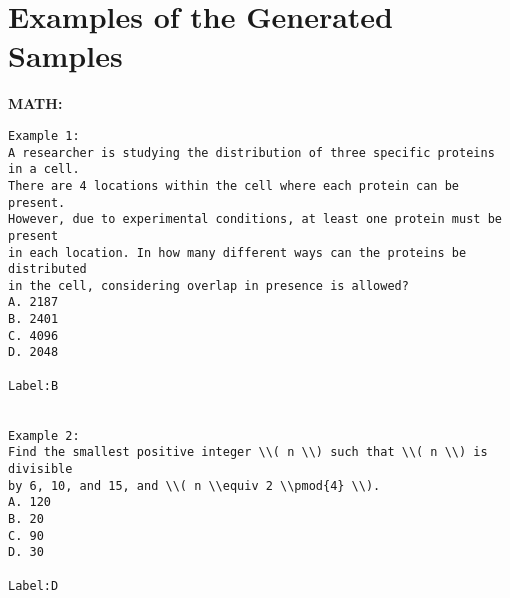 \section{Examples of the Generated Samples}
\label{sec:example}
\textbf{MATH:}
\begin{lstlisting}
Example 1:
A researcher is studying the distribution of three specific proteins in a cell. 
There are 4 locations within the cell where each protein can be present. 
However, due to experimental conditions, at least one protein must be present 
in each location. In how many different ways can the proteins be distributed 
in the cell, considering overlap in presence is allowed?
A. 2187
B. 2401
C. 4096
D. 2048

Label:B


Example 2:
Find the smallest positive integer \\( n \\) such that \\( n \\) is divisible
by 6, 10, and 15, and \\( n \\equiv 2 \\pmod{4} \\).
A. 120
B. 20
C. 90
D. 30

Label:D
\end{lstlisting}

